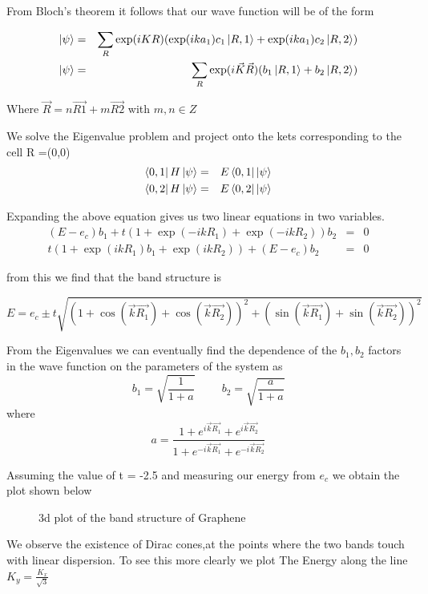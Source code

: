 \documentclass[a4paper]{article}
\begin{document}
From Bloch's theorem it follows that our wave function will be of the form

\begin{eqnarray}
    \ket{\psi}&=&\sum_{R}\exp(iKR)(\exp(ika_{1})c_{1}\ket{R,1} + \exp(ika_{1})c_{2}\ket{R,2} )\\
	\ket{\psi}&=&\sum_{R}\exp(i\vec{K}\vec{R})(b_{1}\ket{R,1} + b_{2}\ket{R,2} )
\end{eqnarray}


Where $\vec{R} = n\vec{R1} + m\vec{R2} $  with $m,n \in Z$


We solve the Eigenvalue problem and project onto the kets corresponding to the cell R =(0,0) 
\begin{eqnarray}
\bra{0,1}H\ket{\psi}&=&E\bra{0,1}\ket{\psi}\\
\bra{0,2}H\ket{\psi}&=&E\bra{0,2}\ket{\psi}
\end{eqnarray}

Expanding the above equation gives us two linear equations in two variables. 
\begin{eqnarray}
(E-e_{c})b_1  +  t(1 + \exp(-ikR_{1}) + \exp(-ikR_{2}))b_2 & = & 0\\
 t(1 + \exp(ikR_{1})b_1  +     \exp(ikR_{2})) + (E-e_{c})b_2 & = &  0
\end{eqnarray}

from this we find that the band structure is

\begin{equation}
E = e_c \pm t\sqrt{(1 + \cos(\vec{k}\vec{R_{1}}) + \cos(\vec{k}\vec{R_{2}}) )^2  + ( \sin(\vec{k}\vec{R_{1}}) + \sin(\vec{k}\vec{R_{2}}) )^2  }
\end{equation}

From the Eigenvalues we can eventually find the dependence of the $b_1,b_2$ factors in the wave function on the parameters of the system as 
\begin{equation}
b_1 = \sqrt{\frac{1}{1+a}}
\hspace{1cm}
b_2 = \sqrt{\frac{a}{1+a}}
\end{equation}
where
\begin{equation*}
a = \frac{1 + e^{i\vec{k}\vec{R_{1}}} + e^{i\vec{k}\vec{R_{2}}}}{1 + e^{-i\vec{k}\vec{R_{1}}} + e^{-i\vec{k}\vec{R_{2}}}}
\end{equation*}

Assuming the value of t = -2.5 and measuring our energy from $e_{c}$
we obtain the plot shown below
\begin{figure}[h]

\centering
\caption{\label{fig:frog}3d plot of the band structure of Graphene}
\end{figure}
\clearpage
We observe the existence of Dirac cones,at the points where the two bands touch with linear dispersion. To see this more clearly we plot The Energy along the line $K_{y} = \frac{K_{x}}{\sqrt{3}}$
\end{document}
